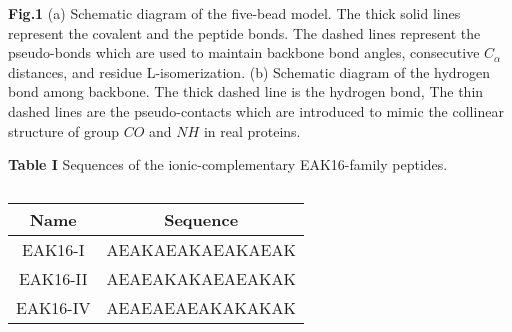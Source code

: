 \documentclass[preprint,preprintnumbers,amsmath,amssymb,showpacs,pre]{revtex4-1}
\begin{document}
\newpage
\vspace{0.5cm}
\parindent 0pt {\large {\bf Fig.1}}
(a) Schematic diagram of the five-bead model. The thick solid lines
represent the covalent and the peptide bonds. The dashed lines
represent the pseudo-bonds which are used to maintain backbone bond
angles, consecutive $C_{\alpha}$ distances, and residue
L-isomerization. (b) Schematic diagram of the hydrogen bond among
backbone. The thick dashed line is the hydrogen bond, The thin
dashed lines are the pseudo-contacts which are introduced to mimic
the collinear structure of group $CO$ and $NH$ in real proteins.

\vspace{0.5cm}
\parindent 0pt {\large {\bf Table I}}
Sequences of the ionic-complementary EAK16-family peptides.

\newpage

\begin{table}
  \centering
  \caption{}
  \begin{tabular}[t]{c|c}
    \hline
     Name & Sequence \\
    \hline
     EAK16-I  & AEAKAEAKAEAKAEAK \\
     EAK16-II & AEAEAKAKAEAEAKAK \\
     EAK16-IV & AEAEAEAEAKAKAKAK \\
    \hline
  \end{tabular}
\end{table}

\end{document}
